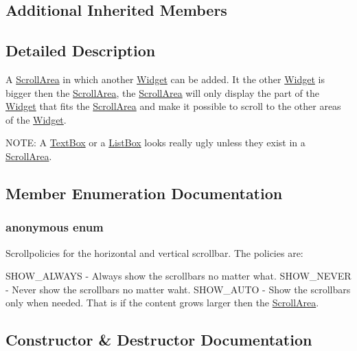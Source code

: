 \subsection*{Additional Inherited Members}


\subsection{Detailed Description}
A \hyperlink{classgcn_1_1ScrollArea}{Scroll\+Area} in which another \hyperlink{classgcn_1_1Widget}{Widget} can be added. It the other \hyperlink{classgcn_1_1Widget}{Widget} is bigger then the \hyperlink{classgcn_1_1ScrollArea}{Scroll\+Area}, the \hyperlink{classgcn_1_1ScrollArea}{Scroll\+Area} will only display the part of the \hyperlink{classgcn_1_1Widget}{Widget} that fits the \hyperlink{classgcn_1_1ScrollArea}{Scroll\+Area} and make it possible to scroll to the other areas of the \hyperlink{classgcn_1_1Widget}{Widget}.

N\+O\+TE\+: A \hyperlink{classgcn_1_1TextBox}{Text\+Box} or a \hyperlink{classgcn_1_1ListBox}{List\+Box} looks really ugly unless they exist in a \hyperlink{classgcn_1_1ScrollArea}{Scroll\+Area}. 

\subsection{Member Enumeration Documentation}
\subsubsection[{\texorpdfstring{anonymous enum}{anonymous enum}}]{\setlength{\rightskip}{0pt plus 5cm}anonymous enum}\hypertarget{classgcn_1_1ScrollArea_aecc83781def500398351a587099626b1}{}\label{classgcn_1_1ScrollArea_aecc83781def500398351a587099626b1}
Scrollpolicies for the horizontal and vertical scrollbar. The policies are\+:

S\+H\+O\+W\+\_\+\+A\+L\+W\+A\+YS -\/ Always show the scrollbars no matter what. S\+H\+O\+W\+\_\+\+N\+E\+V\+ER -\/ Never show the scrollbars no matter waht. S\+H\+O\+W\+\_\+\+A\+U\+TO -\/ Show the scrollbars only when needed. That is if the content grows larger then the \hyperlink{classgcn_1_1ScrollArea}{Scroll\+Area}. 

\subsection{Constructor \& Destructor Documentation}
